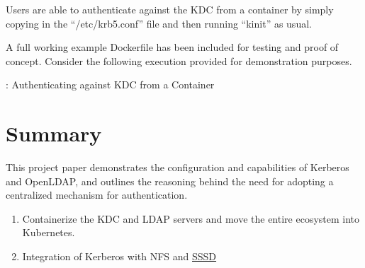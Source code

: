 \vspace{2mm}
\vspace{2mm}

\justifying
Users are able to authenticate against the KDC from a container by simply copying in the ``/etc/krb5.conf'' file and then running ``kinit'' as usual.

\justifying
A full working example Dockerfile has been included for testing and proof of concept. Consider the following execution provided for demonstration purposes.

\begin{mybox}{\thetcbcounter: Authenticating against KDC from a Container}
	
\end{mybox}

\section{\label{sec:summary}Summary}

\justifying
This project paper demonstrates the configuration and capabilities of Kerberos and OpenLDAP, and outlines the reasoning behind the need for adopting a
centralized mechanism for authentication.

\vspace{2mm}
\vspace{2mm}

\begin{raggedright}
	\begin{enumerate}
		\item Containerize the KDC and LDAP servers and move the entire ecosystem into Kubernetes.
		\item Integration of Kerberos with NFS and \href{https://sssd.io/}{SSSD}
	\end{enumerate}
\end{raggedright}

\backmatter{}

\clearpage
\begin{versionhistory}
\end{versionhistory}
\nocite{*}


% 

